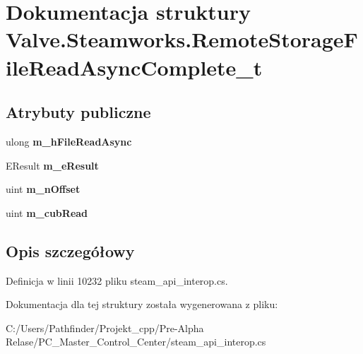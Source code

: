 \hypertarget{struct_valve_1_1_steamworks_1_1_remote_storage_file_read_async_complete__t}{}\section{Dokumentacja struktury Valve.\+Steamworks.\+Remote\+Storage\+File\+Read\+Async\+Complete\+\_\+t}
\label{struct_valve_1_1_steamworks_1_1_remote_storage_file_read_async_complete__t}
\subsection*{Atrybuty publiczne}
\begin{DoxyCompactItemize}
\item 
\mbox{\label{struct_valve_1_1_steamworks_1_1_remote_storage_file_read_async_complete__t_a569c228ba1381049a5c5811bccadb4c7}} 
ulong {\bfseries m\+\_\+h\+File\+Read\+Async}
\item 
\mbox{\label{struct_valve_1_1_steamworks_1_1_remote_storage_file_read_async_complete__t_aef61ebc7a4ca767e38ccebf17b156011}} 
E\+Result {\bfseries m\+\_\+e\+Result}
\item 
\mbox{\label{struct_valve_1_1_steamworks_1_1_remote_storage_file_read_async_complete__t_a28d33e80f76feae0da522a1c2851704b}} 
uint {\bfseries m\+\_\+n\+Offset}
\item 
\mbox{\label{struct_valve_1_1_steamworks_1_1_remote_storage_file_read_async_complete__t_a7a2c5567b726e70ed5302e16831a9327}} 
uint {\bfseries m\+\_\+cub\+Read}
\end{DoxyCompactItemize}


\subsection{Opis szczegółowy}


Definicja w linii 10232 pliku steam\+\_\+api\+\_\+interop.\+cs.



Dokumentacja dla tej struktury została wygenerowana z pliku\+:\begin{DoxyCompactItemize}
\item 
C\+:/\+Users/\+Pathfinder/\+Projekt\+\_\+cpp/\+Pre-\/\+Alpha Relase/\+P\+C\+\_\+\+Master\+\_\+\+Control\+\_\+\+Center/steam\+\_\+api\+\_\+interop.\+cs\end{DoxyCompactItemize}
